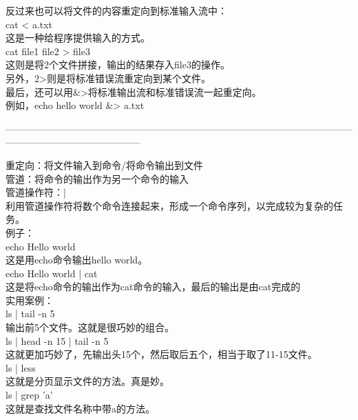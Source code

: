 \documentclass{article}
\begin{document}
\noindent
反过来也可以将文件的内容重定向到标准输入流中：\\
cat < a.txt\\
这是一种给程序提供输入的方式。\\
cat file1 file2 > file3\\
这则是将2个文件拼接，输出的结果存入file3的操作。\\

\noindent
另外，2>则是将标准错误流重定向到某个文件。\\

\noindent
最后，还可以用\&>将标准输出流和标准错误流一起重定向。\\
例如，echo hello world \&> a.txt\\

\begin{center}
    ——————————————————————————————————————————————————\\
\end{center}

\noindent
重定向：将文件输入到命令/将命令输出到文件\\
管道：将命令的输出作为另一个命令的输入\\
管道操作符：|\\
利用管道操作符将数个命令连接起来，形成一个命令序列，以完成较为复杂的任务。\\

\noindent
例子：\\
echo Hello world\\
这是用echo命令输出hello world。\\
echo Hello world | cat\\
这是将echo命令的输出作为cat命令的输入，最后的输出是由cat完成的\\
实用案例：\\
ls | tail -n 5\\
输出前5个文件。这就是很巧妙的组合。\\
ls | head -n 15 | tail -n 5\\
这就更加巧妙了，先输出头15个，然后取后五个，相当于取了11-15文件。\\
ls | less\\
这就是分页显示文件的方法。真是妙。\\
ls | grep 'a'\\
这就是查找文件名称中带a的方法。\\
\end{document}
